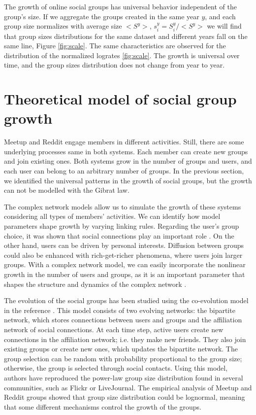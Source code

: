 The growth of online social groups has universal behavior independent of the group's size. If we aggregate the groups created in the same year $y$, and each group size normalizes with average size $<S^y>$, $s^{y}_{i}=S^{y}_{i}/<S^{y}>$ we will find that group sizes distributions for the same dataset and different years fall on the same line, Figure \ref{fig:scale}. The same characteristics are observed for the distribution of the normalized logrates \ref{fig:scale}. The growth is universal over time, and the group sizes distribution does not change from year to year.

\clearpage
\newpage
\section{Theoretical model of social group growth} %

Meetup and Reddit engage members in different activities. Still, there are some underlying processes same in both systems. Each member can create new groups and join existing ones. Both systems grow in the number of groups and users, and each user can belong to an arbitrary number of groups. In the previous section, we identified the universal patterns in the growth of social groups, but the growth can not be modelled with the Gibrat law. 

The complex network models allow us to simulate the growth of these systems considering all types of members' activities. We can identify how model parameters shape growth by varying linking rules.
Regarding the user's group choice, it was shown that social connections play an important role \cite{kairam2012life, zheleva2009co}. On the other hand, users can be driven by personal interests. Diffusion between groups could also be enhanced with rich-get-richer phenomena, where users join larger groups. With a complex network model, we can easily incorporate the nonlinear growth in the number of users and groups, as it is an important parameter that shapes the structure and dynamics of the complex network \cite{mitrovic2011quantitative, dankulov2015dynamics, vranic2021growth}.

The evolution of the social groups has been studied using the co-evolution model in the reference  \cite{zheleva2009co}. This model consists of two evolving networks: the bipartite network, which stores connections between users and groups and the affiliation network of social connections. At each time step, active users create new connections in the affiliation network; i.e. they make new friends. They also join existing groups or create new ones, which updates the bipartite network. The group selection can be random with probability proportional to the group size; otherwise, the group is selected through social contacts. Using this model, authors have reproduced the power-law group size distribution found in several communities, such as Flickr or LiveJournal. The empirical analysis of Meetup and Reddit groups showed that group size distribution could be lognormal, meaning that some different mechanisms control the growth of the groups.

